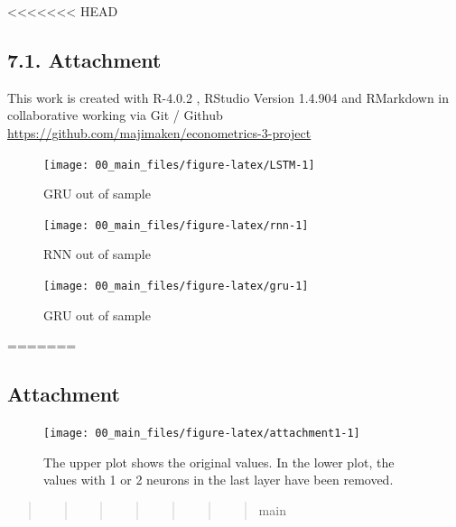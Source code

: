 \documentclass[
]{article}
\begin{document}
\textless\textless\textless\textless\textless\textless\textless{} HEAD
\newpage

\hypertarget{attachement}{%
\subsection{7.1. Attachment}\label{attachement}}

This work is created with R-4.0.2 , RStudio Version 1.4.904 and
RMarkdown in collaborative working via Git / Github
\url{https://github.com/majimaken/econometrics-3-project}

\begin{figure}

{\centering \texttt{[image: 00\_main\_files/figure-latex/LSTM-1]} 

}

\caption{GRU out of sample}\label{fig:LSTM}
\end{figure}

\begin{figure}

{\centering \texttt{[image: 00\_main\_files/figure-latex/rnn-1]} 

}

\caption{RNN out of sample}\label{fig:rnn}
\end{figure}

\begin{figure}

{\centering \texttt{[image: 00\_main\_files/figure-latex/gru-1]} 

}

\caption{GRU out of sample}\label{fig:gru}
\end{figure}

=======

\newpage

\hypertarget{attachment}{%
\subsection{Attachment}\label{attachment}}

\begin{figure}

{\centering \texttt{[image: 00\_main\_files/figure-latex/attachment1-1]} 

}

\caption{The upper plot shows the original values. In the lower plot, the values with 1 or 2 neurons in the last layer have been removed.}\label{fig:attachment1}
\end{figure}

\begin{quote}
\begin{quote}
\begin{quote}
\begin{quote}
\begin{quote}
\begin{quote}
\begin{quote}
main
\end{quote}
\end{quote}
\end{quote}
\end{quote}
\end{quote}
\end{quote}
\end{quote}
\end{document}
